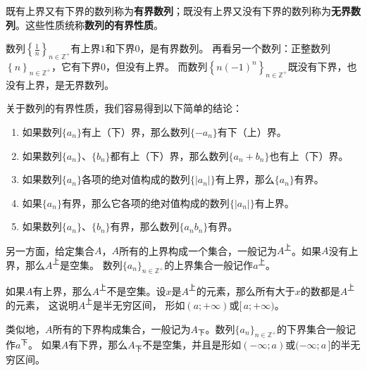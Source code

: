 \documentclass[12pt,UTF8,fontset=none]{ctexbook}
\begin{document}
既有上界又有下界的数列称为\textbf{有界数列}；既没有上界又没有下界的数列称为\textbf{无界数列}。这些性质统称\textbf{数列的有界性质}。

数列$\left\{\frac{1}{n}\right\}_{n\in\mathbb{Z}^+}$有上界$1$和下界$0$，是有界数列。
再看另一个数列：正整数列$\left\{n\right\}_{n\in\mathbb{Z}^+}$，它有下界$0$，但没有上界。
而数列$\left\{n(-1)^n\right\}_{n\in\mathbb{Z}^+}$既没有下界，也没有上界，是无界数列。

关于数列的有界性质，我们容易得到以下简单的结论：
\begin{enumerate}
    \item 如果数列$\{a_n\}$有上（下）界，那么数列$\{-a_n\}$有下（上）界。
    \item 如果数列$\{a_n\}$、$\{b_n\}$都有上（下）界，那么数列$\{a_n + b_n\}$也有上（下）界。
    \item 如果数列$\{a_n\}$各项的绝对值构成的数列$\{|a_n|\}$有上界，那么$\{a_n\}$有界。
    \item 如果$\{a_n\}$有界，那么它各项的绝对值构成的数列$\{|a_n|\}$有上界。
    \item 如果数列$\{a_n\}$、$\{b_n\}$有界，那么数列$\{a_n b_n\}$有界。
\end{enumerate}

另一方面，给定集合$A$，$A$所有的上界构成一个集合，一般记为$A^{\text{上}}$。如果$A$没有上界，那么$A^{\text{上}}$是空集。
数列$\{a_n\}_{n\in\mathbb{Z}^+}$的上界集合一般记作$a^{\text{上}}$。

如果$A$有上界，那么$A^{\text{上}}$不是空集。设$x$是$A^{\text{上}}$的元素，那么所有大于$x$的数都是$A^{\text{上}}$的元素，
这说明$A^{\text{上}}$是半无穷区间，
形如$(a; +\infty)$或$[\,a;+\infty)$。

类似地，$A$所有的下界构成集合，一般记为$A_{\text{下}}$。数列$\{a_n\}_{n\in\mathbb{Z}^+}$的下界集合一般记作$a^{\text{下}}$。
如果$A$有下界，那么$A_{\text{下}}$不是空集，并且是形如$(-\infty; a)$或$(-\infty; a\,]$的半无穷区间。
\end{document}
